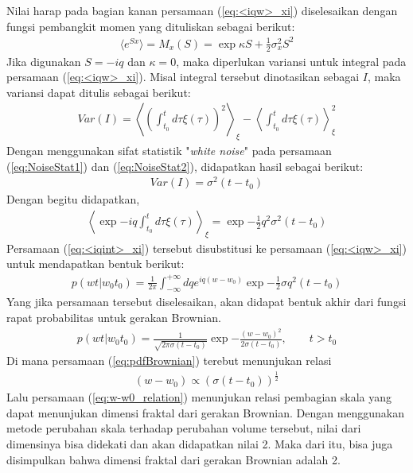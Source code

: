 Nilai harap pada bagian kanan persamaan (\ref{eq:<iqw>_xi}) diselesaikan dengan fungsi pembangkit momen yang dituliskan sebagai berikut:
\begin{align}
    \langle e^{Sx} \rangle = M_x (S) = \exp{\kappa S + \frac{1}{2}\sigma_x^2 S^2} 
\end{align}
Jika digunakan \(S=-iq\) dan \(\kappa=0\), maka diperlukan variansi untuk integral pada persamaan (\ref{eq:<iqw>_xi}). Misal integral tersebut dinotasikan sebagai \(I\), maka variansi dapat ditulis sebagai berikut:
\begin{align}
    Var(I) = \left\langle \left(\int_{t_0}^t d\tau \xi(\tau) \right)^2 \right\rangle_\xi - \left\langle \int_{t_0}^t d\tau \xi(\tau) \right\rangle_\xi^2
\end{align}
Dengan menggunakan sifat statistik "\textit{white noise}" pada persamaan (\ref{eq:NoiseStat1}) dan (\ref{eq:NoiseStat2}), didapatkan hasil sebagai berikut:
\begin{align}
    Var(I) = \sigma^2 (t-t_0)
\end{align}
Dengan begitu didapatkan,
\begin{align}
    \left\langle \exp{-iq\int_{t_0}^t d\tau \xi(\tau)} \right\rangle_\xi = \exp{-\frac{1}{2}q^2\sigma^2(t-t_0)} \label{eq:<iqint>_xi}
\end{align}
Persamaan (\ref{eq:<iqint>_xi}) tersebut disubstitusi ke persamaan (\ref{eq:<iqw>_xi}) untuk mendapatkan bentuk berikut:
\begin{align}
    p(wt|w_0t_0) = \frac{1}{2\pi}\int_{-\infty}^{+\infty} dqe^{iq(w-w_0)}\exp{-\frac{1}{2}\sigma q^2(t-t_0)}
\end{align}
Yang jika persamaan tersebut diselesaikan, akan didapat bentuk akhir dari fungsi rapat probabilitas untuk gerakan Brownian. \cite{Huang1978Stochastic}
\begin{align}
    p(wt|w_0t_0) = \frac{1}{\sqrt{2\pi\sigma(t-t_0)}}\exp{-\frac{(w-w_0)^2}{2\sigma(t-t_0)}}, \qquad t>t_0 \label{eq:pdfBrownian}
\end{align}
Di mana persamaan (\ref{eq:pdfBrownian}) terebut menunjukan relasi
\begin{align}
    (w-w_0) \propto (\sigma(t-t_0))^{\frac{1}{2}} \label{eq:w-w0_relation}
\end{align}
Lalu persamaan (\ref{eq:w-w0_relation}) menunjukan relasi pembagian skala yang dapat menunjukan dimensi fraktal dari gerakan Brownian. Dengan menggunakan metode perubahan skala terhadap perubahan volume tersebut, nilai dari dimensinya bisa didekati dan akan didapatkan nilai 2. Maka dari itu, bisa juga disimpulkan bahwa dimensi fraktal dari gerakan Brownian adalah 2. \cite{Sutton2024Brownian}
